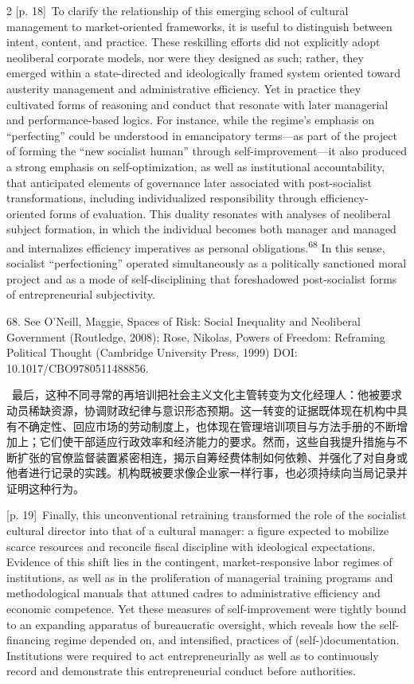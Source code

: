 \documentclass[10pt,a4paper]{article}
\begin{document}
\begin{paracol}{2}
{\scriptsize\color{gray} [p. 18]}\ To clarify the relationship of this emerging school of cultural management to market-oriented frameworks, it is useful to distinguish between intent, content, and practice. These reskilling efforts did not explicitly adopt neoliberal corporate models, nor were they designed as such; rather, they emerged within a state-directed and ideologically framed system oriented toward austerity management and administrative efficiency. Yet in practice they cultivated forms of reasoning and conduct that resonate with later managerial and performance-based logics. For instance, while the regime’s emphasis on “perfecting” could be understood in emancipatory terms—as part of the project of forming the “new socialist human” through self-improvement—it also produced a strong emphasis on self-optimization, as well as institutional accountability, that anticipated elements of governance later associated with post-socialist transformations, including individualized responsibility through efficiency-oriented forms of evaluation. This duality resonates with analyses of neoliberal subject formation, in which the individual becomes both manager and managed and internalizes efficiency imperatives as personal obligations.\nobreak\textsuperscript{68} In this sense, socialist “perfectioning” operated simultaneously as a politically sanctioned moral project and as a mode of self-disciplining that foreshadowed post-socialist forms of entrepreneurial subjectivity.\par{\small 68. See O’Neill, Maggie, Spaces of Risk: Social Inequality and Neoliberal Government (Routledge, 2008); Rose, Nikolas, Powers of Freedom: Reframing Political Thought (Cambridge University Press, 1999) DOI: 10.1017/CBO9780511488856.\par}
\switchcolumn*
{\scriptsize\color{gray} [p. 19]}\ 最后，这种不同寻常的再培训把社会主义文化主管转变为文化经理人：他被要求动员稀缺资源，协调财政纪律与意识形态预期。这一转变的证据既体现在机构中具有不确定性、回应市场的劳动制度上，也体现在管理培训项目与方法手册的不断增加上；它们使干部适应行政效率和经济能力的要求。然而，这些自我提升措施与不断扩张的官僚监督装置紧密相连，揭示自筹经费体制如何依赖、并强化了对自身或他者进行记录的实践。机构既被要求像企业家一样行事，也必须持续向当局记录并证明这种行为。\par
\switchcolumn
{\scriptsize\color{gray} [p. 19]}\ Finally, this unconventional retraining transformed the role of the socialist cultural director into that of a cultural manager: a figure expected to mobilize scarce resources and reconcile fiscal discipline with ideological expectations. Evidence of this shift lies in the contingent, market-responsive labor regimes of institutions, as well as in the proliferation of managerial training programs and methodological manuals that attuned cadres to administrative efficiency and economic competence. Yet these measures of self-improvement were tightly bound to an expanding apparatus of bureaucratic oversight, which reveals how the self-financing regime depended on, and intensified, practices of (self-)documentation. Institutions were required to act entrepreneurially as well as to continuously record and demonstrate this entrepreneurial conduct before authorities.\par

\end{paracol}
\end{document}
